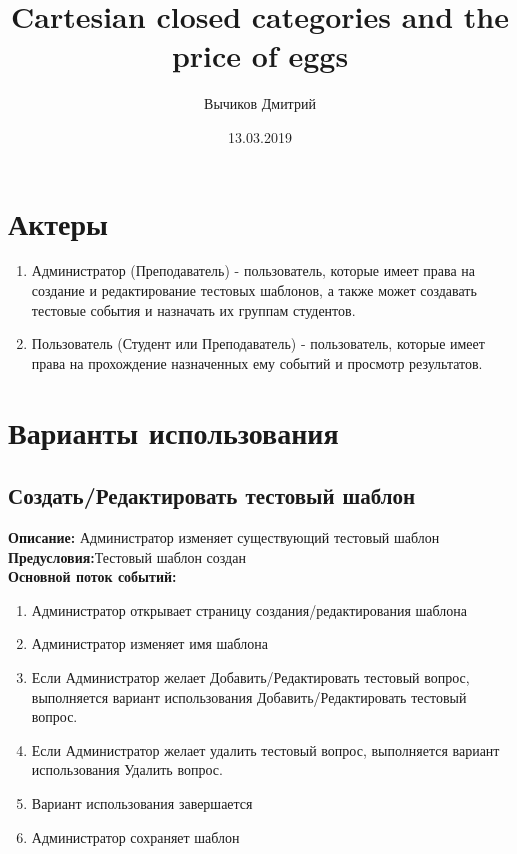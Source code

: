 \documentclass{article}
\title{Cartesian closed categories and the price of eggs}
\author{Вычиков Дмитрий}
\date{13.03.2019}
\begin{document}
    \maketitle
    \section{Актеры}
    \begin{enumerate}
        \item Администратор (Преподаватель) - пользователь, которые имеет права на создание и редактирование тестовых шаблонов, а также может создавать тестовые события и назначать их группам студентов.
        \item Пользователь (Студент или Преподаватель) - пользователь, которые имеет права на прохождение назначенных ему событий и просмотр результатов.
    \end{enumerate}
    

    \section{Варианты использования}
    \subsection{Создать/Редактировать тестовый шаблон}
    \textbf{Описание:} Администратор изменяет существующий тестовый шаблон\\
    \textbf{Предусловия:}Тестовый шаблон создан\\
    \textbf{Основной поток событий:}
    \begin{enumerate}
        \item Администратор открывает страницу создания/редактирования шаблона
        \item Администратор изменяет имя шаблона
        \item Если Администратор желает Добавить/Редактировать тестовый вопрос, выполняется вариант использования Добавить/Редактировать тестовый вопрос.
        \item Если Администратор желает удалить тестовый вопрос, выполняется вариант использования Удалить вопрос.
        \item Вариант использования завершается
        \item Администратор сохраняет шаблон
    \end{enumerate} 
    
\end{document}
